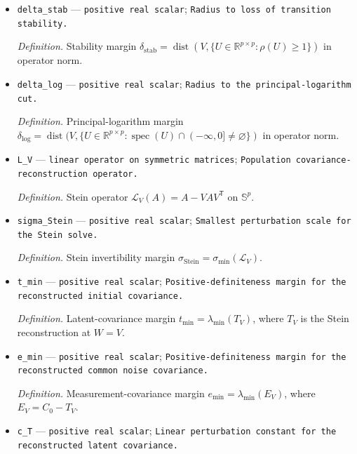 \documentclass{article}
\begin{document}
\begin{itemize}
  \par\smallskip\noindent\emph{Definition.} Transition perturbation constant \(c_V=2c_K(1+\lVert V\rVert)/\kappa\).
  \item \texttt{delta\_\allowbreak{}stab} --- \texttt{positive real scalar}; \texttt{Radius to loss of transition stability.}
  \par\smallskip\noindent\emph{Definition.} Stability margin \(\delta_{\mathrm{stab}}=\operatorname{dist}(V,\{U\in\mathbb R^{p\times p}:\rho(U)\ge1\})\) in operator norm.
  \item \texttt{delta\_\allowbreak{}log} --- \texttt{positive real scalar}; \texttt{Radius to the principal-\allowbreak{}logarithm cut.}
  \par\smallskip\noindent\emph{Definition.} Principal-logarithm margin \(\delta_{\log}=\operatorname{dist}(V,\{U\in\mathbb R^{p\times p}:\operatorname{spec}(U)\cap(-\infty,0]\ne\varnothing\})\) in operator norm.
  \item \texttt{L\_\allowbreak{}V} --- \texttt{linear operator on symmetric matrices}; \texttt{Population covariance-\allowbreak{}reconstruction operator.}
  \par\smallskip\noindent\emph{Definition.} Stein operator \(\mathcal L_V(A)=A-VAV^{\mathsf T}\) on \(\mathbb S^p\).
  \item \texttt{sigma\_\allowbreak{}Stein} --- \texttt{positive real scalar}; \texttt{Smallest perturbation scale for the Stein solve.}
  \par\smallskip\noindent\emph{Definition.} Stein invertibility margin \(\sigma_{\mathrm{Stein}}=\sigma_{\min}(\mathcal L_V)\).
  \item \texttt{t\_\allowbreak{}min} --- \texttt{positive real scalar}; \texttt{Positive-\allowbreak{}definiteness margin for the reconstructed initial covariance.}
  \par\smallskip\noindent\emph{Definition.} Latent-covariance margin \(t_{\min}=\lambda_{\min}(T_V)\), where \(T_V\) is the Stein reconstruction at \(W=V\).
  \item \texttt{e\_\allowbreak{}min} --- \texttt{positive real scalar}; \texttt{Positive-\allowbreak{}definiteness margin for the reconstructed common noise covariance.}
  \par\smallskip\noindent\emph{Definition.} Measurement-covariance margin \(e_{\min}=\lambda_{\min}(E_V)\), where \(E_V=C_0-T_V\).
  \item \texttt{c\_\allowbreak{}T} --- \texttt{positive real scalar}; \texttt{Linear perturbation constant for the reconstructed latent covariance.}

\end{itemize}
\end{document}
